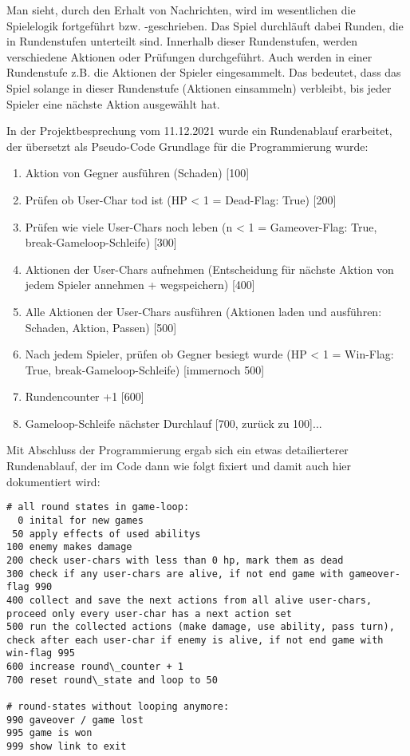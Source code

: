 Man sieht, durch den Erhalt von Nachrichten, wird im wesentlichen die Spielelogik fortgeführt bzw. -geschrieben. Das Spiel durchläuft dabei Runden, die in Rundenstufen unterteilt sind. Innerhalb dieser Rundenstufen, werden verschiedene Aktionen oder Prüfungen durchgeführt. Auch werden in einer Rundenstufe z.B. die Aktionen der Spieler eingesammelt. Das bedeutet, dass das Spiel solange in dieser Rundenstufe (Aktionen einsammeln) verbleibt, bis jeder Spieler eine nächste Aktion ausgewählt hat. 

In der Projektbesprechung vom 11.12.2021 wurde ein Rundenablauf erarbeitet, der übersetzt als Pseudo-Code Grundlage für die Programmierung wurde: 

\begin{enumerate}
    \item Aktion von Gegner ausführen (Schaden) [100]
    \item Prüfen ob User-Char tod ist (HP < 1 = Dead-Flag: True) [200]
    \item Prüfen wie viele User-Chars noch leben (n < 1 = Gameover-Flag: True, break-Gameloop-Schleife) [300]
    \item Aktionen der User-Chars aufnehmen (Entscheidung für nächste Aktion von jedem Spieler annehmen + wegspeichern) [400]
    \item Alle Aktionen der User-Chars ausführen (Aktionen laden und ausführen: Schaden, Aktion, Passen) [500]
    \item Nach jedem Spieler, prüfen ob Gegner besiegt wurde (HP < 1 = Win-Flag: True, break-Gameloop-Schleife) [immernoch 500]
    \item Rundencounter +1 [600]
    \item Gameloop-Schleife nächster Durchlauf [700, zurück zu 100]...
\end{enumerate}

Mit Abschluss der Programmierung ergab sich ein etwas detailierterer Rundenablauf, der im Code dann wie folgt fixiert und damit auch hier dokumentiert wird: 


\begin{lstlisting}
# all round states in game-loop:
  0 inital for new games
 50 apply effects of used abilitys
100 enemy makes damage
200 check user-chars with less than 0 hp, mark them as dead
300 check if any user-chars are alive, if not end game with gameover-flag 990
400 collect and save the next actions from all alive user-chars, proceed only every user-char has a next action set
500 run the collected actions (make damage, use ability, pass turn), check after each user-char if enemy is alive, if not end game with win-flag 995
600 increase round\_counter + 1
700 reset round\_state and loop to 50

# round-states without looping anymore:
990 gaveover / game lost
995 game is won
999 show link to exit
\end{lstlisting}

